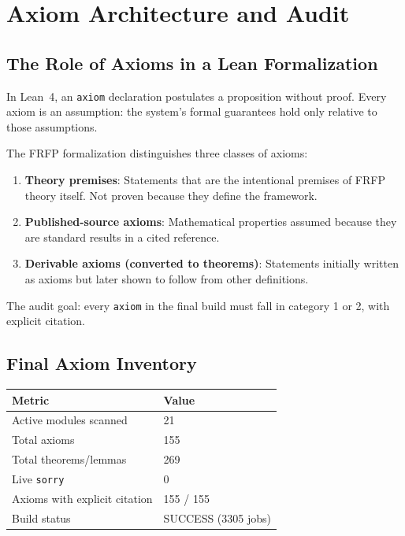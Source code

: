 \section{Axiom Architecture and Audit}
\label{ch:axioms}

\subsection{The Role of Axioms in a Lean Formalization}

In Lean~4, an \texttt{axiom} declaration postulates a proposition without proof.
Every axiom is an assumption: the system's formal guarantees hold only relative to
those assumptions.

The FRFP formalization distinguishes three classes of axioms:

\begin{enumerate}
  \item \textbf{Theory premises}: Statements that are the intentional premises of
        FRFP theory itself. Not proven because they define the framework.
  \item \textbf{Published-source axioms}: Mathematical properties assumed because
        they are standard results in a cited reference.
  \item \textbf{Derivable axioms (converted to theorems)}: Statements initially
        written as axioms but later shown to follow from other definitions.
\end{enumerate}

The audit goal: every \texttt{axiom} in the final build must fall in category 1
or 2, with explicit citation.

\subsection{Final Axiom Inventory}

\begin{center}
\begin{tabular}{ll}
\toprule
Metric & Value \\
\midrule
Active modules scanned & 21 \\
Total axioms & 155 \\
Total theorems/lemmas & 269 \\
Live \texttt{sorry} & 0 \\
Axioms with explicit citation & 155 / 155 \\
Build status & SUCCESS (3305 jobs) \\
\bottomrule
\end{tabular}
\end{center}

